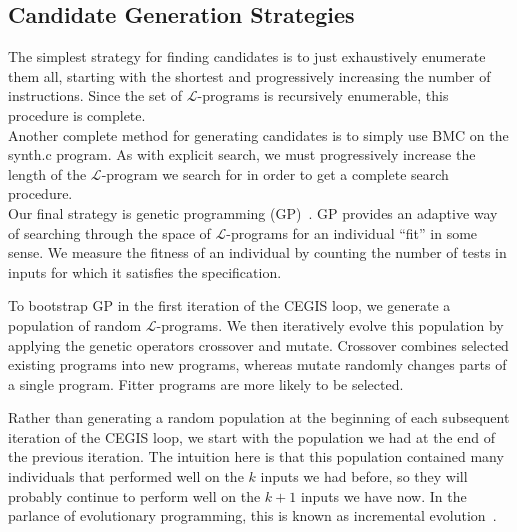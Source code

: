 \documentclass[preprint]{sigplanconf}
\theoremstyle{definition}
\begin{document}
\subsection{Candidate Generation Strategies}
 The simplest strategy for finding candidates
is to just exhaustively enumerate them all, starting with the shortest and
progressively increasing the number of instructions.  Since the set of
$\mathcal{L}$-programs is recursively enumerable, this procedure is complete.
\\

 Another complete method for generating
candidates is to simply use BMC on the {\sc synth.c} program.  As with explicit
search, we must progressively increase the length of the $\mathcal{L}$-program we search for
in order to get a complete search procedure.
\\

 \label{sec:gp}
Our final strategy is genetic programming
(GP)~\cite{langdon:fogp,brameier2007linear}.  GP provides an adaptive way of
searching through the space of $\mathcal{L}$-programs for an individual
``fit'' in some sense.  We measure the
fitness of an individual by counting the number of tests in {\sc inputs}
for which it satisfies the specification.

To bootstrap GP in the first iteration of the CEGIS loop, we generate a population
of random $\mathcal{L}$-programs. We then iteratively evolve this population by
applying the genetic operators {\sc crossover} and {\sc mutate}.
{\sc Crossover} combines selected existing programs into new programs,
whereas {\sc mutate} randomly changes parts of a single program.
Fitter programs are more likely to be selected.




Rather than generating a random population at the beginning of each subsequent
iteration of the CEGIS loop, we start with the population we had at the end of the
previous iteration.  The intuition here is that this population contained
many individuals that performed well on the $k$ inputs we had before, so
they will probably continue to perform well on the $k+1$ inputs we have now.
In the parlance of evolutionary programming, this is known as
incremental evolution~\cite{Gomez97incrementalevolution}.
\end{document}
